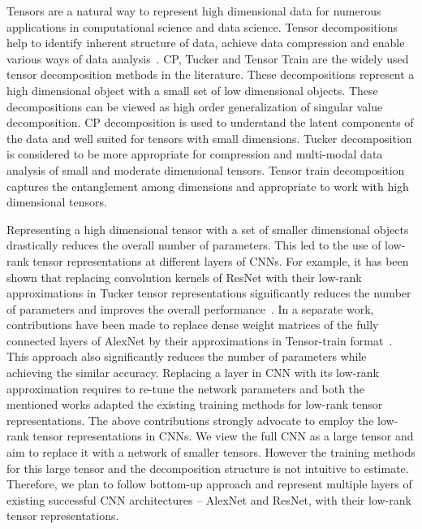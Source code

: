\documentclass[11pt]{article}
\begin{document}
Tensors are a natural way to represent high dimensional data for numerous applications in computational science and data science. Tensor decompositions help to identify inherent structure of data, achieve data compression and enable various ways of data analysis~\cite{KB-SIAMReview2009}. CP, Tucker and Tensor Train are the widely used tensor decomposition methods in the literature. These decompositions represent a high dimensional object with a small set of low dimensional objects. These decompositions can be viewed as high order generalization of singular value decomposition. CP decomposition is used to understand the latent components of the data and well suited for tensors with small dimensions. Tucker decomposition is considered to be more appropriate for compression and multi-modal data analysis of small and moderate dimensional tensors. Tensor train decomposition captures the entanglement among dimensions and appropriate to work with high dimensional tensors.

Representing a high dimensional tensor with a set of smaller dimensional objects drastically reduces the overall number of parameters. This led to the use of low-rank tensor representations at different layers of CNNs. For example, it has been shown that replacing convolution kernels of ResNet with their low-rank approximations in Tucker tensor representations significantly reduces the number of parameters and improves the overall performance~\cite{PSSEG+-ECCV2020}. In a separate work, contributions have been made to replace dense weight matrices of the fully connected layers of AlexNet by their approximations in Tensor-train format~\cite{NPOV-NIPS2015}. This approach also significantly reduces the number of parameters while achieving the similar accuracy. Replacing a layer in CNN with its low-rank approximation requires to re-tune the network parameters and both the mentioned works adapted the existing training methods for low-rank tensor representations. The above contributions strongly advocate to employ the low-rank tensor representations in CNNs. We view the full CNN as a large tensor and aim to replace it with a network of smaller tensors. However the training methods for this large tensor and the decomposition structure is not intuitive to estimate. Therefore, we plan to follow bottom-up approach and represent multiple layers of existing successful CNN architectures -- AlexNet and ResNet, with their low-rank tensor representations.
\end{document}
